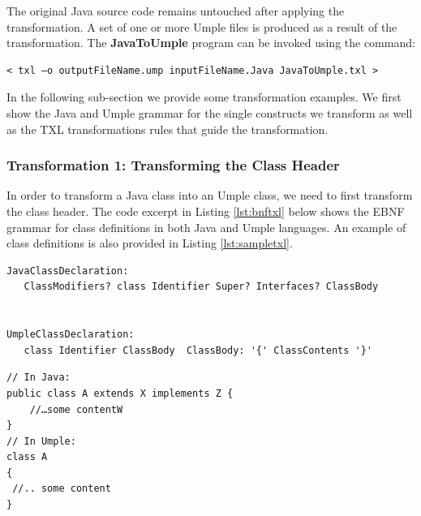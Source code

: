 The original Java source code remains untouched after applying the transformation. A set of one or more Umple files is produced as a result of the transformation. The \textbf{JavaToUmple} program can be invoked using the command:

\vspace{\baselineskip}
\begin{lstlisting}[style=umplePlain]
< txl –o outputFileName.ump inputFileName.Java JavaToUmple.txl >
\end{lstlisting}

In the following sub-section we provide some transformation examples. We first show the Java and Umple grammar for the single constructs we transform as well as the TXL transformations rules that guide the transformation.

\subsubsection{Transformation 1: Transforming the Class Header} 

In order to transform a Java class into an Umple class, we need to first transform the class header. The code excerpt in Listing \ref{lst:bnftxl} below shows the EBNF grammar for class definitions in both Java and Umple languages. An example of class definitions is also provided in Listing \ref{lst:sampletxl}.

\begin{lstlisting}[style=umplePlain, caption="Class definition grammar in BNF form", label=lst:bnftxl]
JavaClassDeclaration: 
   ClassModifiers? class Identifier Super? Interfaces? ClassBody


UmpleClassDeclaration: 
   class Identifier ClassBody  ClassBody: '{' ClassContents '}'

\end{lstlisting}

\begin{lstlisting}[style=umplePlain, caption=Class definitions in Java and Umple, label=lst:sampletxl]
// In Java:
public class A extends X implements Z {
    //…some contentW
}
// In Umple:
class A 
{	
 //.. some content
}
\end{lstlisting}

